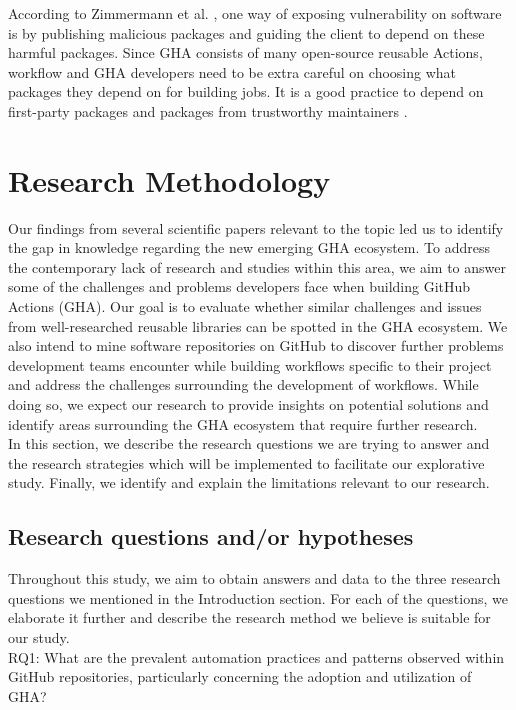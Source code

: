 \documentclass[conference]{IEEEtran}
\begin{document}
 According to Zimmermann et al. \cite{b12}, one way of exposing vulnerability on software is by publishing malicious packages and guiding the client to depend on these harmful packages. Since GHA consists of many open-source reusable Actions, workflow and GHA developers need to be extra careful on choosing what packages they depend on for building jobs. It is a good practice to depend on first-party packages and packages from trustworthy maintainers \cite{b12}.


\section{Research Methodology}
Our findings from several scientific papers relevant to the topic led us to identify the gap in knowledge regarding the new emerging GHA ecosystem. To address the contemporary lack of research and studies within this area, we aim to answer some of the challenges and problems developers face when building GitHub Actions (GHA). Our goal is to evaluate whether similar challenges and issues from well-researched reusable libraries can be spotted in the GHA ecosystem. We also intend to mine software repositories on GitHub to discover further problems development teams encounter while building workflows specific to their project and address the challenges surrounding the development of workflows. While doing so, we expect our research to provide insights on potential solutions and identify areas surrounding the GHA ecosystem that require further research.\\

In this section, we describe the research questions we are trying to answer and the research strategies which will be implemented to facilitate our explorative study. Finally, we identify and explain the limitations relevant to our research.

\subsection{Research questions and/or hypotheses}
Throughout this study, we aim to obtain answers and data to the three research questions we mentioned in the Introduction section. For each of the questions, we elaborate it further and describe the research method we believe is suitable for our study.\\

RQ1: What are the prevalent automation practices and   patterns observed within GitHub repositories, particularly concerning the adoption and utilization of GHA?\\ 
\end{document}
